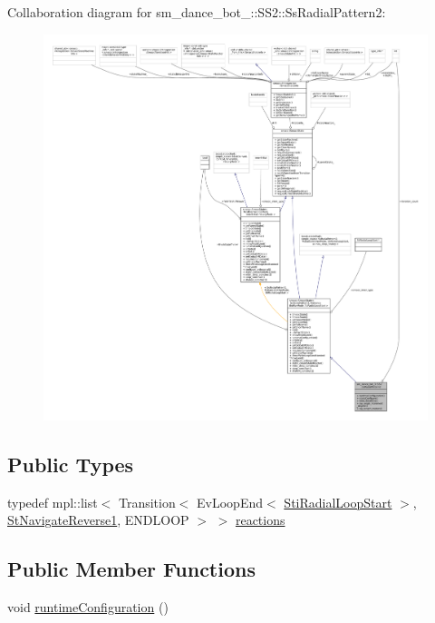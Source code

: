 Collaboration diagram for sm\+\_\+dance\+\_\+bot\+\_\+:\+:S\+S2\+:\+:Ss\+Radial\+Pattern2\+:
\nopagebreak
\begin{figure}[H]
\begin{center}
\leavevmode
\includegraphics[width=350pt]{structsm__dance__bot__3_1_1SS2_1_1SsRadialPattern2__coll__graph}
\end{center}
\end{figure}
\subsection*{Public Types}
\begin{DoxyCompactItemize}
\item 
typedef mpl\+::list$<$ Transition$<$ Ev\+Loop\+End$<$ \hyperlink{structsm__dance__bot__3_1_1radial__motion__states_1_1StiRadialLoopStart}{Sti\+Radial\+Loop\+Start} $>$, \hyperlink{structsm__dance__bot__3_1_1StNavigateReverse1}{St\+Navigate\+Reverse1}, E\+N\+D\+L\+O\+OP $>$ $>$ \hyperlink{structsm__dance__bot__3_1_1SS2_1_1SsRadialPattern2_a6f79f42441e01e2dbd5b08a772e500d7}{reactions}
\end{DoxyCompactItemize}
\subsection*{Public Member Functions}
\begin{DoxyCompactItemize}
\item 
void \hyperlink{structsm__dance__bot__3_1_1SS2_1_1SsRadialPattern2_a97d7592a31a20a48fae0565fc8ecaa4f}{runtime\+Configuration} ()
\end{DoxyCompactItemize}
